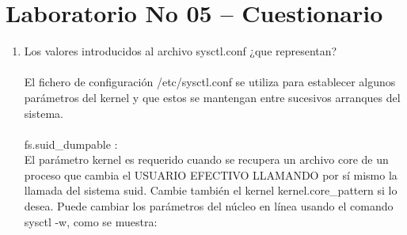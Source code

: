 \section{Laboratorio No 05 – Cuestionario} 

\begin{enumerate}[1.]
	\item Los valores introducidos al archivo sysctl.conf ¿que representan?	
	\\
	\\El fichero de configuración /etc/sysctl.conf se utiliza para establecer algunos parámetros del kernel y que estos se mantengan 	entre sucesivos arranques del sistema.
\\
\\fs.suid\_dumpable :
	\\El parámetro \- kernel es requerido cuando se recupera un archivo core de un proceso que cambia el USUARIO EFECTIVO LLAMANDO por sí mismo la llamada del sistema suid. Cambie también el kernel kernel.core\_pattern si lo desea. Puede cambiar los parámetros del núcleo en línea usando el comando sysctl -w, como se muestra:


\end{enumerate}
